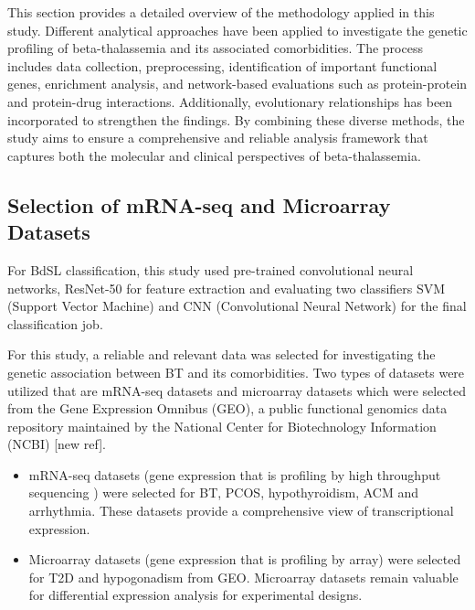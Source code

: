 This section provides a detailed overview of the methodology applied in this study. Different analytical approaches have been applied to investigate the genetic profiling of beta-thalassemia and its associated comorbidities. The process includes data collection, preprocessing, identification of important functional genes, enrichment analysis, and network-based evaluations such as protein-protein and protein-drug interactions. Additionally, evolutionary relationships has been incorporated to strengthen the findings. By combining these diverse methods, the study aims to ensure a comprehensive and reliable analysis framework that captures both the molecular and clinical perspectives of beta-thalassemia.

\subsection{Selection of mRNA-seq and Microarray Datasets}
\label{sec:sec3_4_1}
For BdSL classification, this study used pre-trained convolutional neural networks, ResNet-50 for feature extraction and evaluating two classifiers SVM (Support Vector Machine) and CNN (Convolutional Neural Network) for the final classification job.

For this study, a reliable and relevant data was selected for investigating the genetic association between BT and its comorbidities. Two types of datasets were utilized that are mRNA-seq datasets and microarray datasets which were selected from the Gene Expression Omnibus (GEO), a public functional genomics data repository maintained by the National Center for Biotechnology Information (NCBI) [new ref].

\begin{itemize}
    \item mRNA-seq datasets (gene expression that is profiling by high throughput sequencing ) were selected for BT, PCOS, hypothyroidism, ACM and arrhythmia. These datasets provide a comprehensive view of transcriptional expression.
    \item Microarray datasets (gene expression that is profiling by array) were selected for T2D and hypogonadism from GEO. Microarray datasets remain valuable for differential expression analysis for experimental designs.
\end{itemize}



